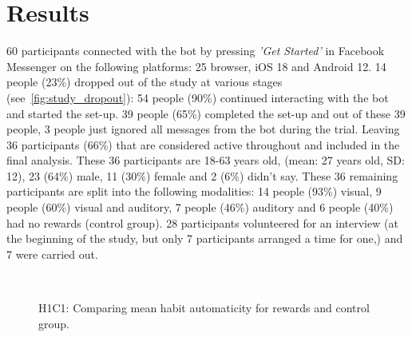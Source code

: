 \documentclass{scaffold/sigchi}
\begin{document}
\section{Results}
60 participants connected with the bot by pressing \textit{'Get Started'} in Facebook Messenger on the following platforms: 25 browser, iOS 18 and Android 12. 14 people (23\%) dropped out of the study at various stages (see~\ref{fig:study_dropout}): 54 people (90\%) continued interacting with the bot and started the set-up. 39 people (65\%) completed the set-up and out of these 39 people, 3 people just ignored all messages from the bot during the trial. Leaving 36 participants (66\%) that are considered active throughout and included in the final analysis. These 36 participants are 18-63 years old, (mean: 27 years old, SD: 12), 23 (64\%) male, 11 (30\%) female and 2 (6\%) didn't say. These 36 remaining participants are split into the following modalities: 14 people (93\%) visual, 9 people (60\%) visual and auditory, 7 people (46\%) auditory and 6 people (40\%) had no rewards (control group). 28 participants volunteered for an interview (at the beginning of the study, but only 7 participants arranged a time for one,) and 7 were carried out.



\begin{figure}
  \centering
  \caption{H1C1: Comparing mean habit automaticity for rewards and control group.}~\label{fig:habit_4_item_survey1_v_survey2}
\end{figure}
\end{document}
